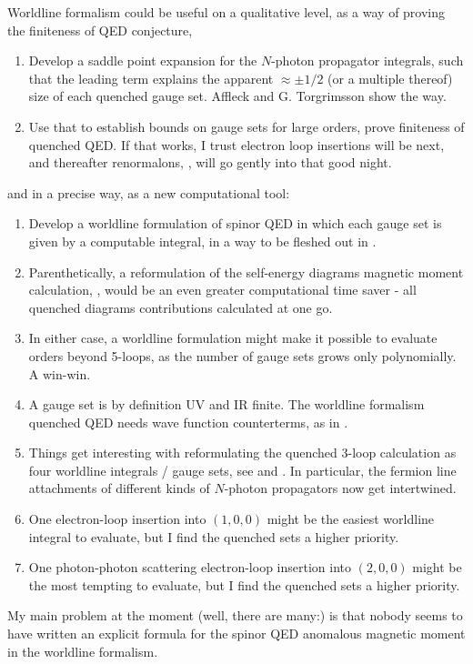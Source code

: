 Worldline formalism could be useful on a qualitative level, as a way of
proving the finiteness of QED conjecture,
    \begin{enumerate}
  \item
Develop a saddle point expansion for the $N$-photon propagator
integrals, such that the
leading term explains the apparent $\approx \pm 1/2$ (or a multiple
thereof) size of each quenched gauge set. Affleck \etal{}
and G. Torgrimsson \etal{} show the way.
  \item
Use that to establish bounds on gauge sets for large orders, prove
finiteness of quenched QED. If that works, I trust electron loop
insertions will be next, and thereafter renormalons, \etc,
will go 
{gently into that good night}.
    \end{enumerate}
and in a precise way, as a new computational tool:
    \begin{enumerate}
  \item
Develop a worldline formulation of spinor QED in which each gauge set is
given by a computable integral, in a way to be fleshed out in
.
  \item
Parenthetically, a reformulation of the self-energy diagrams magnetic
moment calculation, , would be an even greater
computational time saver - all quenched diagrams contributions calculated
at one go.
  \item
In either case, a
worldline formulation might make it possible to evaluate orders beyond
5-loops, as the number of gauge sets grows only polynomially. A win-win.
  \item
A gauge set is by definition UV and IR finite. The worldline formalism
quenched QED needs wave function
counterterms, as in .
  \item
Things get interesting with reformulating the quenched 3-loop calculation
as four worldline integrals / gauge sets, see  and
. In particular, the fermion line attachments of
different kinds of $N$-photon propagators now get intertwined.
  \item
One electron-loop insertion into $(1,0,0)$  might be the easiest
worldline integral to
evaluate, but I find the quenched sets a higher priority.
  \item
One photon-photon scattering electron-loop insertion into $(2,0,0)$ might
be the most tempting to evaluate, but I find the quenched sets a higher
priority.
    \end{enumerate}
My main problem at the moment (well, there are many:) is that nobody
seems to have written an explicit formula for the spinor QED anomalous
magnetic moment in the worldline formalism.

\newpage

\newpage

\newpage
\printbibliography[heading=subbibintoc,title={References}]
